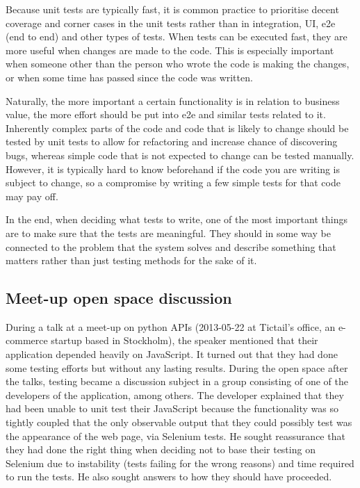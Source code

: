 \documentclass[11pt]{article}
\begin{document}
Because unit tests are typically fast, it is common practice to prioritise decent coverage and corner cases in the unit tests rather than in integration, UI, e2e (end to end) and other types of tests. When tests can be executed fast, they are more useful when changes are made to the code. This is especially important when someone other than the person who wrote the code is making the changes, or when some time has passed since the code was written. \cite[questions~22-24]{Stenmark}

Naturally, the more important a certain functionality is in relation to business value, the more effort should be put into e2e and similar tests related to it. Inherently complex parts of the code and code that is likely to change should be tested by unit tests to allow for refactoring and increase chance of discovering bugs, whereas simple code that is not expected to change can be tested manually. However, it is typically hard to know beforehand if the code you are writing is subject to change, so a compromise by writing a few simple tests for that code may pay off. \cite[questions~28-29 and 33]{Stenmark}

In the end, when deciding what tests to write, one of the most important things are to make sure that the tests are meaningful. They should in some way be connected to the problem that the system solves and describe something that matters rather than just testing methods for the sake of it. \cite[questions~17-18]{Ahnve}

\subsection{Meet-up open space discussion}
\label{sec:openspace}

During a talk at a meet-up on python APIs (2013-05-22 at Tictail's office, an e-commerce startup based in Stockholm), the speaker mentioned that their application depended heavily on JavaScript. It turned out that they had done some testing efforts but without any lasting results. During the open space after the talks, testing became a discussion subject in a group consisting of one of the developers of the application, among others. The developer explained that they had been unable to unit test their JavaScript because the functionality was so tightly coupled that the only observable output that they could possibly test was the appearance of the web page, via Selenium tests. He sought reassurance that they had done the right thing when deciding not to base their testing on Selenium due to instability (tests failing for the wrong reasons) and time required to run the tests. He also sought answers to how they should have proceeded.
\end{document}
